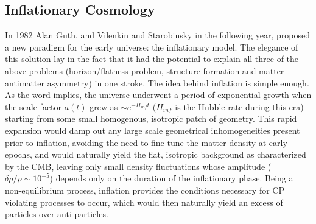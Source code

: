 \begin{doublespace}
\subsection{Inflationary Cosmology}

In 1982 Alan Guth, and Vilenkin and Starobinsky in the following year, proposed a new paradigm for the early universe: the inflationary model. The elegance of this solution lay in the fact that it had the potential to explain all three of the above problems (horizon/flatness problem, structure formation and matter-antimatter asymmetry) in one stroke. The idea behind inflation is simple enough. As the word implies, the universe underwent a period of exponential growth when the scale factor $a(t)$ grew as $\sim e^{-H_{inf} t}$ ($H_{inf}$ is the Hubble rate during this era) starting from some small homogenous, isotropic patch of geometry. This rapid expansion would damp out any large scale geometrical inhomogeneities present prior to inflation, avoiding the need to fine-tune the matter density at early epochs, and would naturally yield the flat, isotropic background as characterized by the CMB, leaving only small density fluctuations whose amplitude ($\delta \rho/\rho \sim 10^{-5}$) depends only on the duration of the inflationary phase. Being a non-equilibrium process, inflation provides the conditions necessary for CP violating processes to occur, which would then naturally yield an excess of particles over anti-particles.


\end{doublespace}
